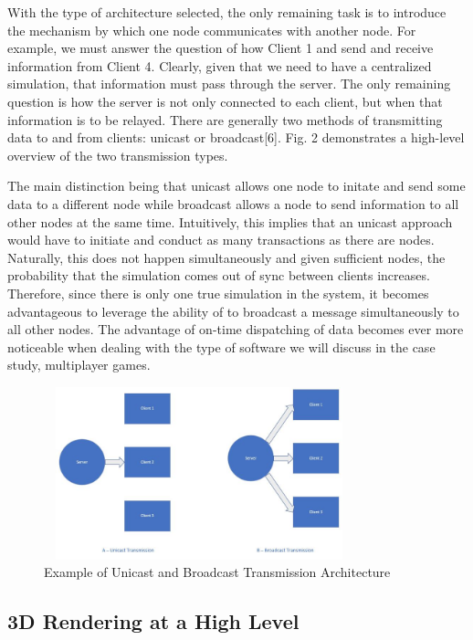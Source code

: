 \documentclass[conference]{IEEEtran}
\begin{document}
With the type of architecture selected, the only remaining task is to introduce the mechanism by which one node communicates with another node. For example, we must answer
the question of how Client 1 and send and receive information from Client 4. Clearly, given that we need to have a centralized simulation, that information must pass through 
the server. The only remaining question is how the server is not only connected to each client, but when that information is to be relayed. There are generally two methods of transmitting
data to and from clients: unicast or broadcast[6]. Fig. 2 demonstrates a high-level overview of the two transmission types. 

The main distinction being that unicast allows one node to initate and send some data to a different node while broadcast allows a node to send information to all other nodes at the same time. 
Intuitively, this implies that an unicast approach would have to initiate and conduct as many transactions as there are nodes. Naturally, this does not happen simultaneously and given sufficient nodes,
the probability that the simulation comes out of sync between clients increases. Therefore, since there is only one true simulation in the system, it becomes advantageous to leverage the ability of 
to broadcast a message simultaneously to all other nodes. The advantage of on-time dispatching of data becomes ever more noticeable when dealing with the type of software we will discuss in the case study, multiplayer
games. 

\begin{figure}[htbp]
\centerline{\includegraphics [width = 9cm, height = 5cm] {TransmissionArchitecture.jpg}}
\caption{Example of Unicast and Broadcast Transmission Architecture}
\end{figure}

\subsection{3D Rendering at a High Level}
\end{document}

